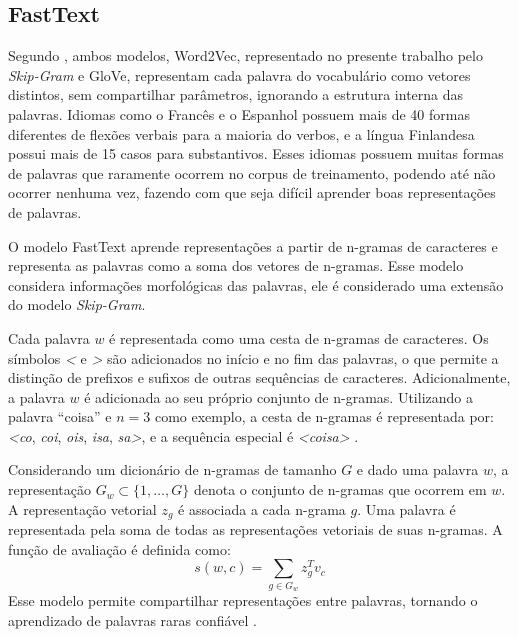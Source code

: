 \subsection{FastText}
\label{sec:word-embedding-fasttext}

Segundo \textcite{Bojanowski2016Bojanowski}, ambos modelos, Word2Vec, representado no presente trabalho pelo \textit{Skip-Gram} e GloVe, representam cada palavra do vocabulário como vetores distintos, sem compartilhar parâmetros, ignorando a estrutura interna das palavras. Idiomas como o Francês e o Espanhol possuem mais de 40 formas diferentes de flexões verbais para a maioria do verbos, e a língua Finlandesa possui mais de 15 casos para substantivos. Esses idiomas possuem muitas formas de palavras que raramente ocorrem no corpus de treinamento, podendo até não ocorrer nenhuma vez, fazendo com que seja difícil aprender boas representações de palavras.

O modelo FastText aprende representações a partir de n-gramas de caracteres e representa as palavras como a soma dos vetores de n-gramas. Esse modelo considera informações morfológicas das palavras, ele é considerado uma extensão do modelo \textit{Skip-Gram}.

Cada palavra $w$ é representada como uma cesta de n-gramas de caracteres. Os símbolos \textit{<} e \textit{>} são adicionados no início e no fim das palavras, o que permite a distinção de prefixos e sufixos de outras sequências de caracteres. Adicionalmente, a palavra $w$ é adicionada ao seu próprio conjunto de n-gramas. Utilizando a palavra \enquote{coisa} e $n = 3$ como exemplo, a cesta de n-gramas é representada por: \textit{<co}, \textit{coi}, \textit{ois}, \textit{isa}, \textit{sa>}, e a sequência especial é \textit{<coisa>} \cite{Bojanowski2016Bojanowski}.

Considerando um dicionário de n-gramas de tamanho $G$ e dado uma palavra $w$, a representação $G_w \subset \{1,\dots,G\}$ denota o conjunto de n-gramas que ocorrem em $w$. A representação vetorial $z_g$ é associada a cada n-grama $g$. Uma palavra é representada pela soma de todas as representações vetoriais de suas n-gramas. A função de avaliação é definida como:
\begin{equation}
    \label{eq:fasttext_model_score}
    s(w, c) = \sum_{g \in G_w} z_g^T v_c 
\end{equation}
Esse modelo permite compartilhar representações entre palavras, tornando o aprendizado de palavras raras confiável \cite{Bojanowski2016Bojanowski}.

